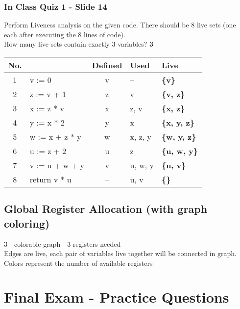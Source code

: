 \documentclass{report}
\begin{document}
\vspace{-1em}
\subsection{In Class Quiz 1 - Slide 14}
\vspace{-1em}
\begin{multicols}{2}
Perform Liveness analysis on the given code. There should
be 8 live sets (one each after executing the 8 lines of code). \\
How many live sets contain exactly 3 variables? \textbf{3}
\vfill\columnbreak
\begin{tabular}{c|l|c|l|>{\bfseries}l}
  \textbf{No.} &  & \textbf{Defined} & \textbf{Used} & \textbf{Live} \\
  \hline
   1  & v := 0            & v  & --      & \{v\}       \\
   2  & z := v + 1        & z  & v       & \{v, z\}    \\
   3  & x := z * v        & x  & z, v    & \{x, z\}    \\
   4  & y := x * 2        & y  & x       & \{x, y, z\} \\
   5  & w := x + z * y    & w  & x, z, y & \{w, y, z\} \\
   6  & u := z + 2        & u  & z       & \{u, w, y\} \\
   7  & v := u + w + y    & v  & u, w, y & \{u, v\}    \\
   8  & return v * u      & -- & u, v    & \{\}        \\
\end{tabular}
\end{multicols}


\section{Global Register Allocation (with graph coloring)}
3 - colorable graph - 3 registers needed \\
Edges are live, each pair of variables live together will be connected in graph. \\
Colors represent the number of available registers \\


\renewcommand\thechapter{E2}
\chapter{Final Exam - Practice Questions}
\end{document}

